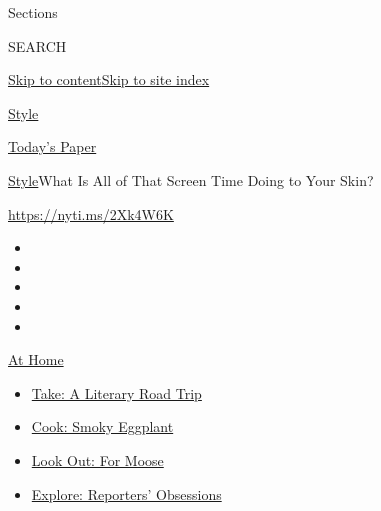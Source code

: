 Sections

SEARCH

\protect\hyperlink{site-content}{Skip to
content}\protect\hyperlink{site-index}{Skip to site index}

\href{https://www.nytimes3xbfgragh.onion/section/style}{Style}

\href{https://myaccount.nytimes3xbfgragh.onion/auth/login?response_type=cookie\&client_id=vi}{}

\href{https://www.nytimes3xbfgragh.onion/section/todayspaper}{Today's
Paper}

\href{/section/style}{Style}\textbar{}What Is All of That Screen Time
Doing to Your Skin?

\url{https://nyti.ms/2Xk4W6K}

\begin{itemize}
\item
\item
\item
\item
\item
\end{itemize}

\href{https://www.nytimes3xbfgragh.onion/spotlight/at-home?action=click\&pgtype=Article\&state=default\&region=TOP_BANNER\&context=at_home_menu}{At
Home}

\begin{itemize}
\tightlist
\item
  \href{https://www.nytimes3xbfgragh.onion/2020/07/28/books/time-for-a-literary-road-trip.html?action=click\&pgtype=Article\&state=default\&region=TOP_BANNER\&context=at_home_menu}{Take:
  A Literary Road Trip}
\item
  \href{https://www.nytimes3xbfgragh.onion/2020/07/29/magazine/bored-with-your-home-cooking-some-smoky-eggplant-will-fix-that.html?action=click\&pgtype=Article\&state=default\&region=TOP_BANNER\&context=at_home_menu}{Cook:
  Smoky Eggplant}
\item
  \href{https://www.nytimes3xbfgragh.onion/2020/07/27/travel/moose-michigan-isle-royale.html?action=click\&pgtype=Article\&state=default\&region=TOP_BANNER\&context=at_home_menu}{Look
  Out: For Moose}
\item
  \href{https://www.nytimes3xbfgragh.onion/interactive/2020/at-home/even-more-reporters-editors-diaries-lists-recommendations.html?action=click\&pgtype=Article\&state=default\&region=TOP_BANNER\&context=at_home_menu}{Explore:
  Reporters' Obsessions}
\end{itemize}

